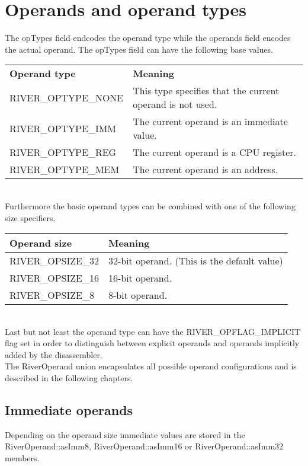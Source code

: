 \documentclass[12pt]{report}
\begin{document}
\section{Operands and operand types}
\label{sec:operands-and-operand-types}
The opTypes field endcodes the operand type while the operands field encodes the actual operand. The opTypes field can have the following base values.\\
\begin{tabular}[t]{| p{6cm} | p{10cm} |}
\hline
	\textbf{Operand type} & \textbf{Meaning}\\
	RIVER_OPTYPE_NONE & This type specifies that the current operand is not used.\\ \hline
	RIVER_OPTYPE_IMM & The current operand is an immediate value.\\ \hline
	RIVER_OPTYPE_REG & The current operand is a CPU register.\\ \hline
	RIVER_OPTYPE_MEM & The current operand is an address.\\ \hline
\end{tabular}\\
\newline
Furthermore the basic operand types can be combined with one of the following size specifiers.\\
\begin{tabular}[t]{| p{6cm} | p{10cm} |}
	\hline
	\textbf{Operand size} & \textbf{Meaning}\\ \hline
	RIVER_OPSIZE_32 & 32-bit operand. (This is the default value)\\ \hline
	RIVER_OPSIZE_16 & 16-bit operand.\\ \hline
	RIVER_OPSIZE_8 & 8-bit operand.\\ \hline
\end{tabular}\\
\newline
Last but not least the operand type can have the RIVER_OPFLAG_IMPLICIT flag set in order to distinguish between explicit operands and operands implicitly added by the disassembler.\\
\newline
The RiverOperand union encapsulates all possible operand configurations and is described in the following chapters.\\

\subsection{Immediate operands}
\label{ssec:immediate-operands}
Depending on the operand size immediate values are stored in the RiverOperand::asImm8, RiverOperand::asImm16 or RiverOperand::asImm32 members.\\
\end{document}
